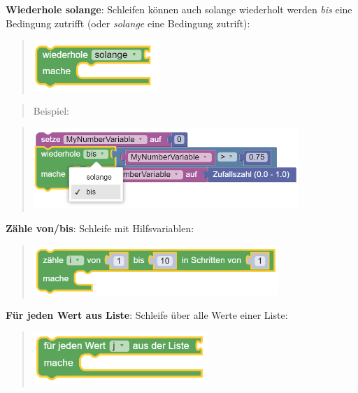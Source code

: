 \documentclass[
  letterpaper,
  DIV=11]{scrreprt}
\begin{document}
\begin{tcolorbox}
\textbf{Wiederhole solange}: Schleifen können auch solange wiederholt
werden \emph{bis} eine Bedingung zutrifft (oder \emph{solange} eine
Bedingung zutrift):

\begin{quote}
\includegraphics[width=1.875in,height=\textheight]{img/screenshot-blockly-loop-repeat-while-01-DEU.png}
\end{quote}

\begin{quote}
Beispiel:
\end{quote}

\begin{quote}
\includegraphics[width=3.95833in,height=\textheight]{img/screenshot-blockly-loop-repeat-while-example-01-DEU.png}
\end{quote}

\textbf{Zähle von/bis}: Schleife mit Hilfsvariablen:

\begin{quote}
\includegraphics[width=3.64583in,height=\textheight]{img/screenshot-blockly-loop-for-01-DEU.png}
\end{quote}

\textbf{Für jeden Wert aus Liste}: Schleife über alle Werte einer Liste:

\begin{quote}
\includegraphics[width=2.60417in,height=\textheight]{img/screenshot-blockly-loop-list-01-DEU.png}
\end{quote}


\end{tcolorbox}
\end{document}
